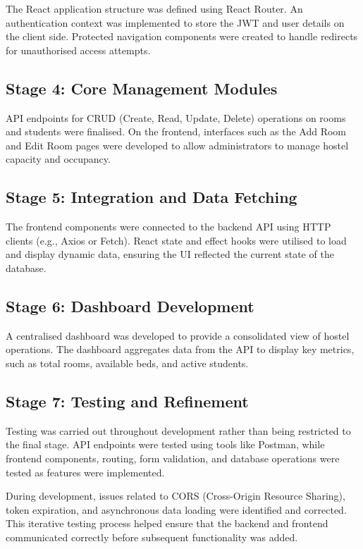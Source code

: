 The React application structure was defined using React Router. An authentication context was implemented to store the JWT and user details on the client side. Protected navigation components were created to handle redirects for unauthorised access attempts.

\subsection{Stage 4: Core Management Modules}

API endpoints for CRUD (Create, Read, Update, Delete) operations on rooms and students were finalised. On the frontend, interfaces such as the Add Room and Edit Room pages were developed to allow administrators to manage hostel capacity and occupancy. 

\subsection{Stage 5: Integration and Data Fetching}

The frontend components were connected to the backend API using HTTP clients (e.g., Axios or Fetch). React state and effect hooks were utilised to load and display dynamic data, ensuring the UI reflected the current state of the database.

\subsection{Stage 6: Dashboard Development}

A centralised dashboard was developed to provide a consolidated view of hostel operations. The dashboard aggregates data from the API to display key metrics, such as total rooms, available beds, and active students.

\subsection{Stage 7: Testing and Refinement}

Testing was carried out throughout development rather than being restricted to the final stage. API endpoints were tested using tools like Postman, while frontend components, routing, form validation, and database operations were tested as features were implemented.

During development, issues related to CORS (Cross-Origin Resource Sharing), token expiration, and asynchronous data loading were identified and corrected. This iterative testing process helped ensure that the backend and frontend communicated correctly before subsequent functionality was added.

